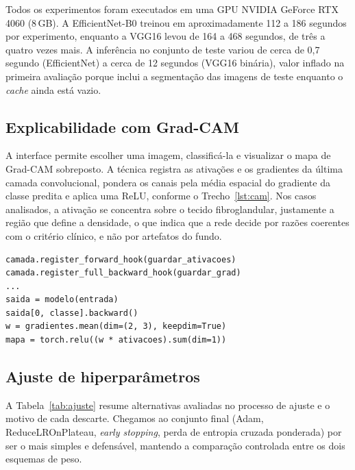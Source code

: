 \documentclass[twocolumn,a4paper,11pt]{article}
\begin{document}
Todos os experimentos foram executados em uma GPU NVIDIA GeForce RTX 4060 (8\,GB). A
EfficientNet\nobreakdash-B0 treinou em aproximadamente 112 a 186 segundos por experimento,
enquanto a VGG16 levou de 164 a 468 segundos, de três a quatro vezes mais. A
inferência no conjunto de teste variou de cerca de 0,7 segundo (EfficientNet) a
cerca de 12 segundos (VGG16 binária), valor inflado na primeira avaliação porque
inclui a segmentação das imagens de teste enquanto o \emph{cache} ainda está vazio.

\subsection{Explicabilidade com Grad\nobreakdash-CAM}

A interface permite escolher uma imagem, classificá\nobreakdash-la e visualizar o mapa de
Grad\nobreakdash-CAM sobreposto. A técnica registra as ativações e os gradientes da última
camada convolucional, pondera os canais pela média espacial do gradiente da classe
predita e aplica uma ReLU, conforme o Trecho~\ref{lst:cam}. Nos casos analisados, a
ativação se concentra sobre o tecido fibroglandular, justamente a região que define
a densidade, o que indica que a rede decide por razões coerentes com o critério
clínico, e não por artefatos do fundo.

\noindent\begin{minipage}{\linewidth}
\begin{lstlisting}[caption={Núcleo do Grad-CAM: hooks e combinação ponderada.},label=lst:cam]
camada.register_forward_hook(guardar_ativacoes)
camada.register_full_backward_hook(guardar_grad)
...
saida = modelo(entrada)
saida[0, classe].backward()
w = gradientes.mean(dim=(2, 3), keepdim=True)
mapa = torch.relu((w * ativacoes).sum(dim=1))
\end{lstlisting}
\end{minipage}

\subsection{Ajuste de hiperparâmetros}

A Tabela~\ref{tab:ajuste} resume alternativas avaliadas no processo de ajuste e o
motivo de cada descarte. Chegamos ao conjunto final (Adam, ReduceLROnPlateau,
\emph{early stopping}, perda de entropia cruzada ponderada) por ser o mais simples
e defensável, mantendo a comparação controlada entre os dois esquemas de peso.
\end{document}
